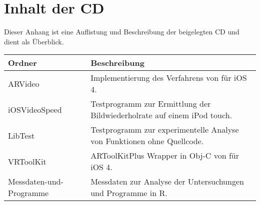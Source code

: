 \chapter{Inhalt der CD} %
\label{cha:anhang}
Dieser Anhang ist eine Auflistung und Beschreibung der beigelegten CD und dient als Überblick.
\\
\begin{center}
    \begin{tabular}{p{5cm}p{8.5cm}}
	\toprule
	Ordner & Beschreibung\\
	\midrule
	ARVideo &
	Implementierung des Verfahrens von \citeauthor{hirzer08} für iOS 4.\\
	iOSVideoSpeed &
	Testprogramm zur Ermittlung der Bildwiederholrate auf einem iPod touch.\\
	LibTest &
	Testprogramm zur experimentelle Analyse von Funktionen ohne Quellcode.\\
	VRToolKit &
	ARToolKitPlus Wrapper in Obj-C von \citeauthor{vrtoolkit} für iOS 4.\\
	Messdaten-und-Programme &
	Messdaten zur Analyse der Untersuchungen und Programme in R.\\
	\bottomrule
	\end{tabular}
\end{center}
